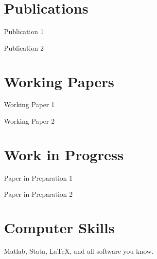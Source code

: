 \documentclass[a4paper]{article}
\renewenvironment{itemize}{
  \begin{list}{}{
    \setlength{\leftmargin}{1em}
  }
}{
  \end{list}
}
\begin{document}
\section*{Publications}
\begin{itemize}
\item Publication 1
\item Publication 2
\end{itemize}
\section*{Working Papers}
\begin{itemize}
\item Working Paper 1
\item Working Paper 2
\end{itemize}
\section*{Work in Progress}
\begin{itemize}
\item Paper in Preparation 1
\item Paper in Preparation 2
\end{itemize}

\section*{Computer Skills}
Matlab, Stata, \LaTeX, and all software you know.

\bigskip
\begin{center}
\begin{footnotesize}
\end{footnotesize}
\end{center}
\end{document}
